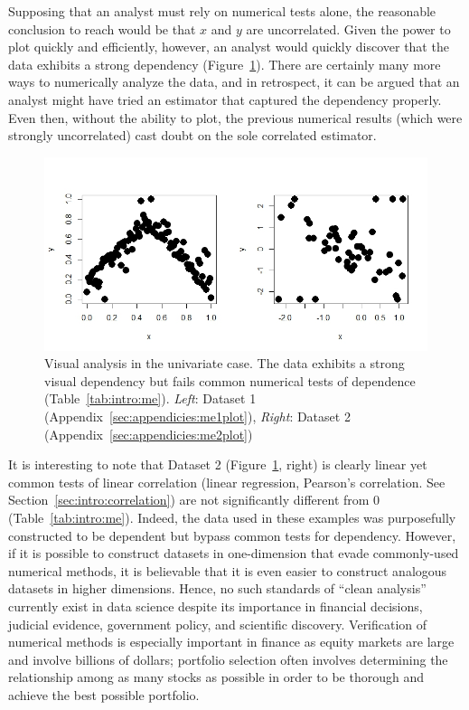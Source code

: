 Supposing that an analyst must rely on numerical tests alone, the reasonable
conclusion to reach would be that $x$ and $y$ are uncorrelated. Given the power
to plot quickly and efficiently, however, an analyst would quickly discover that
the data exhibits a strong dependency (Figure~\ref{fig:intro:meplot}). There are
certainly many more ways to numerically analyze the data, and in retrospect, it
can be argued that an analyst might have tried an estimator that captured the
dependency properly. Even then, without the ability to plot, the previous
numerical results (which were strongly uncorrelated) cast doubt on the sole
correlated estimator.

\begin{figure}[htb]
	\begin{center}
		\includegraphics[width=1\linewidth]{ch-intro/figures/me}
		\caption[Visual analysis in the univariate case.]{Visual analysis in the
			univariate case. The data exhibits a strong visual dependency but 
			fails common
			numerical tests of dependence (Table~\ref{tab:intro:me}). 
			\textit{Left}: Dataset
			1 (Appendix~\ref{sec:appendicies:me1plot}), \textit{Right}: Dataset 
			2
			(Appendix~\ref{sec:appendicies:me2plot})}
		\label{fig:intro:meplot}
	\end{center}
\end{figure}

It is interesting to note that Dataset 2 (Figure~\ref{fig:intro:meplot}, right)
is clearly linear yet common tests of linear correlation (linear regression,
Pearson's correlation. See Section~\ref{sec:intro:correlation}) are not
significantly different from 0 (Table~\ref{tab:intro:me}). Indeed, the data used
in these examples was purposefully constructed to be dependent but bypass common
tests for dependency. However, if it is possible to construct datasets in
one-dimension that evade commonly-used numerical methods, it is believable that
it is even easier to construct analogous datasets in higher dimensions. Hence,
no such standards of ``clean analysis'' currently exist in data science despite
its importance in financial decisions, judicial evidence, government policy, and
scientific discovery. Verification of numerical methods is especially important
in finance as equity markets are large and involve billions of dollars;
portfolio selection often involves determining the relationship among as many
stocks as possible in order to be thorough and achieve the best possible
portfolio. 
